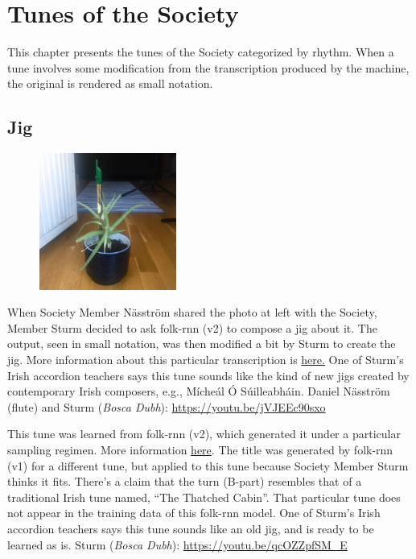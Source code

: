 \documentclass[a4paper,notitlepage,twoside]{book}
\begin{document}
\chapter{Tunes of the Society}
This chapter presents the tunes of the Society
categorized by rhythm.
When a tune involves some modification from 
the transcription produced by the machine, the original
is rendered as small notation.

\section{Jig}
{}
\hypertarget{jig:AloeVeras}{}
\begin{figure}
\vspace{-0.3in}
\includegraphics[width=0.4\textwidth]{AloeVera.jpg}
\end{figure}
When Society Member Näsström shared the photo at left with the Society,
Member Sturm decided to ask folk-rnn (v2) to compose a jig about it.
The output, seen in small notation, was then modified a bit by Sturm to create the jig.
More information about this particular transcription is \href{https://themachinefolksession.org/tune/902}{here.}
One of Sturm's Irish accordion teachers says this tune sounds like the kind of new jigs
created by contemporary Irish composers, e.g., 
Mícheál Ó Súilleabháin.
Daniel Näsström (flute) and Sturm ({\em Bosca Dubh}): \url{https://youtu.be/jVJEEc90sxo}

\clearpage
{}
{}
\hypertarget{jig:BoysofBallinaburre}{}
This tune was learned from folk-rnn (v2),
which generated it under a particular sampling regimen.
More information \href{https://highnoongmt.wordpress.com/2019/08/19/making-sense-of-the-folk-rnn-v2-model-part-11/}{here}.
The title was generated by folk-rnn (v1) for a different tune, 
but applied to this tune because Society Member Sturm thinks it fits.
There's a claim that the turn (B-part) resembles that of a traditional Irish tune named, ``The Thatched Cabin''.
That particular tune does not appear in the training data of this folk-rnn model.
One of Sturm's Irish accordion teachers says this tune sounds like an old jig, 
and is ready to be learned as is.
Sturm ({\em Bosca Dubh}): \url{https://youtu.be/qcOZZpfSM_E}
\end{document}
